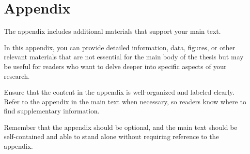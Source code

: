 \appendix
\chapter{Appendix}

The appendix includes additional materials that support your main text.

In this appendix, you can provide detailed information, data, figures, or other relevant materials that are not essential for the main body of the thesis but may be useful for readers who want to delve deeper into specific aspects of your research.

Ensure that the content in the appendix is well-organized and labeled clearly. Refer to the appendix in the main text when necessary, so readers know where to find supplementary information.

Remember that the appendix should be optional, and the main text should be self-contained and able to stand alone without requiring reference to the appendix.

